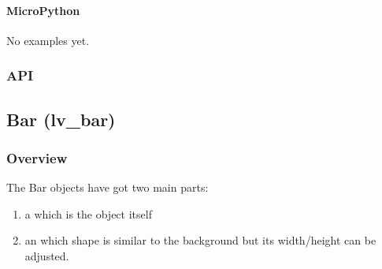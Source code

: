 \documentclass[letterpaper,10pt,english]{sphinxmanual}
\begin{document}
\begin{sphinxVerbatim}[commandchars=\\\{\}]
   
  
  
    
\end{sphinxVerbatim}


\paragraph{MicroPython}
\label{\detokenize{object-types/arc:micropython}}
No examples yet.


\subsubsection{API}
\label{\detokenize{object-types/arc:api}}

\subsection{Bar (lv\_bar)}
\label{\detokenize{object-types/bar:bar-lv-bar}}\label{\detokenize{object-types/bar::doc}}

\subsubsection{Overview}
\label{\detokenize{object-types/bar:overview}}
The Bar objects have got two main parts:
\begin{enumerate}
\def\theenumi{\arabic{enumi}}
\def\labelenumi{\theenumi .}
\makeatletter\def\p@enumii{\p@enumi \theenumi .}\makeatother
\item {} 
a  which is the object itself

\item {} 
an  which shape is similar to the background but its width/height can be adjusted.

\end{enumerate}
\end{document}
